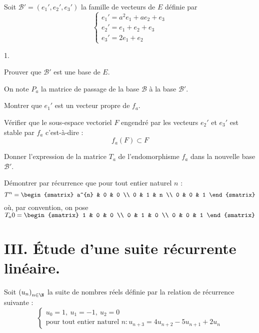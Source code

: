 \documentclass[11pt]{article}%
\begin{document}
Soit $\mathcal{B}{\prime } = \left( e_{1}{\prime },e_{2}{\prime
},e_{3}{\prime }\right) $ la famille de vecteurs de $E$ définie par
\[
\left\{
\begin{array}{l}
e_{1}{\prime } = a^{2}e_{1} + ae_{2} + e_{3} \\
e_{2}{\prime } = e_{1} + e_{2} + e_{3} \\
e_{3}{\prime } = 2e_{1} + e_{2}
\end{array}
\right.
\]

\begin{noliste}{1.}
 \setlength{\itemsep}{4mm}
\item Prouver que $\mathcal{B}{\prime }$ est une base de $E$.

\hspace{-1cm}On note $P_{a}$ la matrice de passage de la base
$\mathcal{B}$
à la base $\mathcal{B}{\prime }$.

\item Montrer que $e_{1}{\prime }$ est un vecteur propre de $f_{a}$.

\item Vérifier que le sous-espace vectoriel $F$ engendré par les
vecteurs $e_{2}{\prime }$ et $e_{3}{\prime }$ est stable par $f_{a}$
c'est-à-dire :
\[
f_{a}\left( F\right) \subset F
\]

\item Donner l'expression de la matrice $T_{a}$ de l'endomorphisme
$f_{a}$
dans la nouvelle base $\mathcal{B}{\prime }$.

\item Démontrer par récurrence que pour tout entier naturel $n$ :
\[
T^{n} = 
\begin{smatrix}
a^{n} & 0 & 0 \\
0 & 1 & n \\
0 & 0 & 1
\end{smatrix}
\]
où, par convention, on pose $T_{a}{0} = 
\begin{smatrix}
1 & 0 & 0 \\
0 & 1 & 0 \\
0 & 0 & 1
\end{smatrix}
$
\end{noliste}

\section*{III. Étude d'une suite récurrente linéaire.}

Soit $\left( u_{n}\right)_{n\in \N}$ la suite de nombres réels définie
par la relation de récurrence suivante :
\[
\left\{
\begin{array}{l}
u_{0} = 1,\ u_{1} = -1,\ u_{2} = 0 \\
\text{pour tout entier naturel }n :u_{n + 3} = 4u_{n + 2}-5u_{n + 1} +
2u_{n}
\end{array}
\right.
\]
\end{document}
